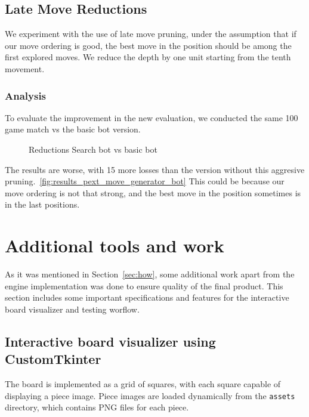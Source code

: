 \subsection{Late Move Reductions}

We experiment with the use of late move pruning, under the assumption that if our move ordering is good, the best move in the position should be among the first explored moves. We reduce the depth by one unit starting from the tenth movement.

\subsubsection{Analysis}

To evaluate the improvement in the new evaluation, we conducted the same 100 game match vs the basic bot version.

\begin{center}
    \begin{figure}[H]
        \centering
        \caption{Reductions Search bot vs basic bot}
        \label{fig:results_reductions_search_bot}
    \end{figure}
\medskip
\end{center}

\noindent The results are worse, with 15 more losses than the version without this aggresive pruning.~\ref{fig:results_pext_move_generator_bot} This could be because our move ordering is not that strong, and the best move in the position sometimes is in the last positions.

\section{Additional tools and work}
\label{sec:tools}

As it was mentioned in Section~\ref{sec:how}, some additional work apart from the engine implementation was done to ensure quality of the final product. This section includes some important specifications and features for the interactive board visualizer and testing worflow.

\subsection{Interactive board visualizer using CustomTkinter}

The board is implemented as a grid of squares, with each square capable of displaying a piece image. Piece images are loaded dynamically from the \texttt{assets} directory, which contains PNG files for each piece.

